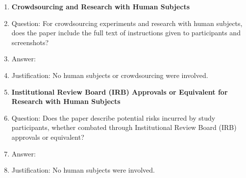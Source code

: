 \begin{enumerate}
\item {\bf Crowdsourcing and Research with Human Subjects}
    \item[] Question: For crowdsourcing experiments and research with human subjects, does the paper include the full text of instructions given to participants and screenshots?
    \item[] Answer: \answerNA{}
    \item[] Justification: No human subjects or crowdsourcing were involved.

\item {\bf Institutional Review Board (IRB) Approvals or Equivalent for Research with Human Subjects}
    \item[] Question: Does the paper describe potential risks incurred by study participants, whether combated through Institutional Review Board (IRB) approvals or equivalent?
    \item[] Answer: \answerNA{}
    \item[] Justification: No human subjects were involved.

\end{enumerate}
